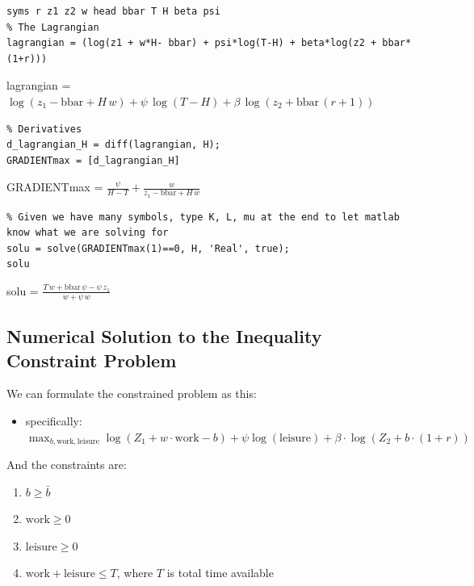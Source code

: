 \documentclass[
]{book}
\providecommand{\tightlist}{%
  \setlength{\itemsep}{0pt}\setlength{\parskip}{0pt}}
\begin{document}
\begin{verbatim}
syms r z1 z2 w head bbar T H beta psi
% The Lagrangian
lagrangian = (log(z1 + w*H- bbar) + psi*log(T-H) + beta*log(z2 + bbar*(1+r)))
\end{verbatim}

lagrangian =
\(\displaystyle \log \left(z_1 -\textrm{bbar}+H\,w\right)+\psi \,\log \left(T-H\right)+\beta \,\log \left(z_2 +\textrm{bbar}\,{\left(r+1\right)}\right)\)

\begin{verbatim}
% Derivatives
d_lagrangian_H = diff(lagrangian, H);
GRADIENTmax = [d_lagrangian_H]
\end{verbatim}

GRADIENTmax =
\(\displaystyle \frac{\psi }{H-T}+\frac{w}{z_1 -\textrm{bbar}+H\,w}\)

\begin{verbatim}
% Given we have many symbols, type K, L, mu at the end to let matlab know what we are solving for
solu = solve(GRADIENTmax(1)==0, H, 'Real', true);
solu
\end{verbatim}

solu =
\(\displaystyle \frac{T\,w+\textrm{bbar}\,\psi -\psi \,z_1 }{w+\psi \,w}\)

\hypertarget{numerical-solution-to-the-inequality-constraint-problem}{%
\subsection{Numerical Solution to the Inequality Constraint Problem}\label{numerical-solution-to-the-inequality-constraint-problem}}

We can formulate the constrained problem as this:

\begin{itemize}
\tightlist
\item
  specifically:
  \(\max_{b,\textrm{work},\textrm{leisure}} \log (Z_1 +w\cdot \textrm{work}-b)+\psi \log (\textrm{leisure})+\beta \cdot \log (Z_2 +b\cdot (1+r))\)
\end{itemize}

And the constraints are:

\begin{enumerate}
\def\labelenumi{\arabic{enumi}.}
\item
  \(\displaystyle b\ge \bar{b}\)
\item
  \(\displaystyle \textrm{work}\ge 0\)
\item
  \(\displaystyle \textrm{leisure}\ge 0\)
\item
  \(\textrm{work}+\textrm{leisure}\le T\), where \(T\) is total time
  available
\end{enumerate}
\end{document}
